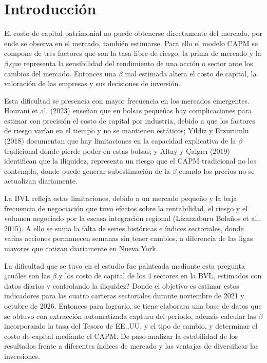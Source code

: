 \documentclass[jrfm,article,submit,oneauthor]{Definitions/mdpi}
\begin{document}
\section{Introducción}
El costo de capital patrimonial no puede obtenerse directamente del mercado, por ende se  observa en el mercado, también estimarse. Para ello el modelo CAPM se compone de tres factores que son la tasa libre de riesgo, la prima de mercado y la $\beta$,que representa la sensibilidad del rendimiento de una acción o sector ante los cambios del mercado. Entonces una $\beta$ mal estimada altera el costo de capital, la valoración de las empresas y sus decisiones de inversión.

Esta dificultad se presencia con mayor frecuencia en los mercados emergentes. Hourani et al. (2023) enseñan que en bolsas pequeñas hay complicaciones para estimar con precisión el costo de capital por industria, debido a que los factores de riesgo varían en el tiempo y no se mantienen estáticos; Yildiz y Erzurumlu (2018) documentan que hay limitaciones en la capacidad explicativa de la $\beta$ tradicional donde pierde poder en estas bolsas; y Altay y Çalgıcı (2019) identifican que la iliquidez, representa un riesgo que el CAPM tradicional no los contempla, donde puede generar subestimación de la $\beta$ cuando los precios no se actualizan diariamente.

La BVL refleja estas limitaciones, debido a un mercado pequeño y la baja frecuencia de negociación que tuvo efectos sobre la rentabilidad, el riesgo y el volumen negociado por la escasa integración regional (Lizarzaburu Bolaños et al., 2015). A ello se suma la falta de series históricas e índices sectoriales, donde varias acciones permanecen semanas sin tener cambios, a diferencia de las ligas mayores que cotizan diariamente en Nueva York.

La dificultad que se tuvo en el estudio fue palnteada mediante esta pregunta ¿cuáles son las $\beta$ y los costo de capital de los 4 sectores en la BVL, estimados con datos diarios y controlando la iliquidez? Donde el objetivo es estimar estos indicadores para las cuatro carteras sectoriales durante noviembre de 2021 y octubre de 2026. Entonces para lograrlo, se tiene  elaborara una base de datos que se obtuvo con extracción automatizada captura del periodo, además calcular las $\beta$ incorporando la tasa del Tesoro de EE.,UU. y el tipo de cambio, y determinar el costo de capital mediante el CAPM. De paso analizar la estabilidad de los resultados frente a diferentes índices de mercado y las ventajas de diversificar las inversiones. 
\end{document}
